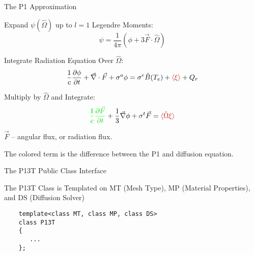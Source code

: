 \documentclass{myslidehead}
\begin{document}

\begin{slide}

  \begin{center}
    \large The P1 Approximation
  \end{center}

  Expand $\psi(\hat{\Omega})$ up to $l=1$ Legendre Moments:
  \[
       \psi = \frac{1}{4\pi} \left(
                        \phi + 3 \vec{F} \cdot \hat{\Omega}
                   \right)
  \]

  Integrate Radiation Equation Over $\hat{\Omega}$:
  \[
     \frac{1}{c} \frac{\partial{\phi}}{\partial{t}}
        + \vec{\nabla} \cdot \vec{F}
        + \sigma^{a} \phi
        =  \sigma^{e} \hat{B}(T_{e})
           + \textcolor{red}{\langle \xi \rangle}
           + Q_{r}
  \]

  Multiply by $\hat{\Omega}$ and Integrate:
  \[
        \textcolor{green}{\frac{1}{c} \frac{\partial{\vec{F}}}{\partial{t}}}
        + \frac{1}{3} \vec{\nabla} \phi
        + \sigma^{t} \vec{F}
        = \textcolor{red}{\langle \hat{\Omega} \xi \rangle}
  \]

\end{slide}


\begin{note}
                                
  $\vec{F}$ -- angular flux, or radiation flux.

  The colored term is the difference between the P1
  and diffusion equation.

\end{note}


\begin{slide}

  \begin{center}
    \large The P13T Public Class Interface
  \end{center}

  The P13T Class is Templated on MT (Mesh Type), MP (Material Properties),
  and DS (Diffusion Solver)

  \begin{verbatim}
    template<class MT, class MP, class DS>
    class P13T
    {
       ...
    };
  \end{verbatim}

\end{slide}
\end{document}
